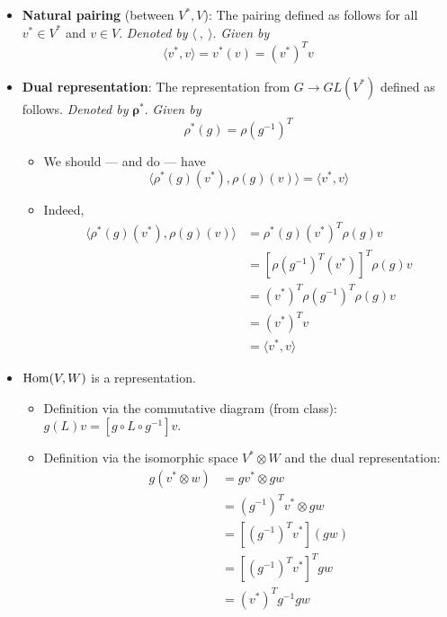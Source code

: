 \documentclass[../notes.tex]{subfiles}
\begin{document}
\begin{itemize}
\begin{itemize}
    \end{itemize}
    \item \textbf{Natural pairing} (between $V^*,V$): The pairing defined as follows for all $v^*\in V^*$ and $v\in V$. \emph{Denoted by} $\bm{\langle\ ,\ \rangle}$. \emph{Given by}
    \begin{equation*}
        \langle v^*,v \rangle = v^*(v) = (v^*)^Tv
    \end{equation*}
    \item \textbf{Dual representation}: The representation from $G\to GL(V^*)$ defined as follows. \emph{Denoted by} $\bm{\rho^*}$. \emph{Given by}
    \begin{equation*}
        \rho^*(g) = \rho(g^{-1})^T
    \end{equation*}
    \begin{itemize}
        \item We should --- and do --- have
        \begin{equation*}
            \langle \rho^*(g)(v^*),\rho(g)(v) \rangle = \langle v^*,v \rangle
        \end{equation*}
        \item Indeed,
        \begin{align*}
            \langle \rho^*(g)(v^*),\rho(g)(v) \rangle &= \rho^*(g)(v^*)^T\rho(g)v\\
            &= [\rho(g^{-1})^T(v^*)]^T\rho(g)v\\
            &= (v^*)^T\rho(g^{-1})^T\rho(g)v\\
            &= (v^*)^Tv\\
            &= \langle v^*,v \rangle
        \end{align*}
    \end{itemize}
    \item $\operatorname{Hom}(V,W)$ is a representation.
    \begin{itemize}
        \item Definition via the commutative diagram (from class): $g(L)v=[g\circ L\circ g^{-1}]v$.
        \item Definition via the isomorphic space $V^*\otimes W$ and the dual representation:
        \begin{align*}
            g(v^*\otimes w) &= gv^*\otimes gw\\
            &= (g^{-1})^Tv^*\otimes gw\\
            &= [(g^{-1})^Tv^*](gw)\\
            &= [(g^{-1})^Tv^*]^Tgw\\
            &= (v^*)^Tg^{-1}gw\\

\end{align*}
\end{itemize}
\end{itemize}
\end{document}
